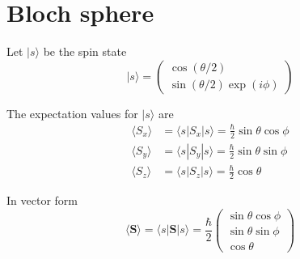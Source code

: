 

\section*{Bloch sphere}

Let $|s\rangle$ be the spin state
\begin{equation*}
|s\rangle=\begin{pmatrix}
\cos(\theta/2)
\\
\sin(\theta/2)\exp(i\phi)
\end{pmatrix}
\end{equation*}

The expectation values for $|s\rangle$ are
\begin{align*}
\langle S_x\rangle&=\langle s|S_x|s\rangle=\frac{\hbar}{2}\sin\theta\cos\phi
\\[1ex]
\langle S_y\rangle&=\langle s|S_y|s\rangle=\frac{\hbar}{2}\sin\theta\sin\phi
\\[1ex]
\langle S_z\rangle&=\langle s|S_z|s\rangle=\frac{\hbar}{2}\cos\theta
\end{align*}

In vector form
\begin{equation*}
\langle\mathbf S\rangle=\langle s|\mathbf S|s\rangle
=\frac{\hbar}{2}\begin{pmatrix}
\sin\theta\cos\phi
\\
\sin\theta\sin\phi
\\
\cos\theta
\end{pmatrix}
\end{equation*}

